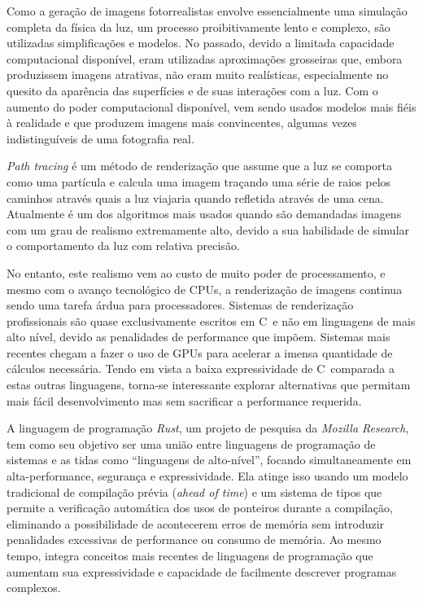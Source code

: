 \documentclass[tg]{mdtufsm}
\def\Cpp{{C\nolinebreak[4]\raisebox{.20ex}{\small\bf++}}}
\begin{document}
Como a geração de imagens fotorrealistas envolve essencialmente uma simulação completa da física da
luz, um processo proibitivamente lento e complexo, são utilizadas simplificações e modelos. No
passado, devido a limitada capacidade computacional disponível, eram utilizadas aproximações
grosseiras que, embora produzissem imagens atrativas, não eram muito realísticas, especialmente no
quesito da aparência das superfícies e de suas interações com a luz. Com o aumento do poder
computacional disponível, vem sendo usados modelos mais fiéis à realidade e que produzem imagens
mais convincentes, algumas vezes indistinguíveis de uma fotografia real.

\emph{Path tracing} é um método de renderização que assume que a luz se comporta como uma partícula
e calcula uma imagem traçando uma série de raios pelos caminhos através quais a luz viajaria quando
refletida através de uma cena. Atualmente é um dos algoritmos mais usados quando são demandadas
imagens com um grau de realismo extremamente alto, devido a sua habilidade de simular o
comportamento da luz com relativa precisão.

No entanto, este realismo vem ao custo de muito poder de processamento, e mesmo com o avanço
tecnológico de CPUs, a renderização de imagens continua sendo uma tarefa árdua para processadores.
Sistemas de renderização profissionais são quase exclusivamente escritos em \Cpp\ e não em
linguagens de mais alto nível, devido as penalidades de performance que impõem. Sistemas mais
recentes chegam a fazer o uso de GPUs para acelerar a imensa quantidade de cálculos necessária.
Tendo em vista a baixa expressividade de \Cpp\ comparada a estas outras linguagens, torna-se
interessante explorar alternativas que permitam mais fácil desenvolvimento mas sem sacrificar a
performance requerida.

A linguagem de programação \emph{Rust}, um projeto de pesquisa da \emph{Mozilla Research}, tem como
seu objetivo ser uma união entre linguagens de programação de sistemas e as tidas como ``linguagens
de alto-nível'', focando simultaneamente em alta-performance, segurança e expressividade. Ela atinge
isso usando um modelo tradicional de compilação prévia (\emph{ahead of time}) e um sistema de tipos
que permite a verificação automática dos usos de ponteiros durante a compilação, eliminando a
possibilidade de acontecerem erros de memória sem introduzir penalidades excessivas de performance
ou consumo de memória. Ao mesmo tempo, integra conceitos mais recentes de linguagens de programação
que aumentam sua expressividade e capacidade de facilmente descrever programas complexos.
\end{document}
